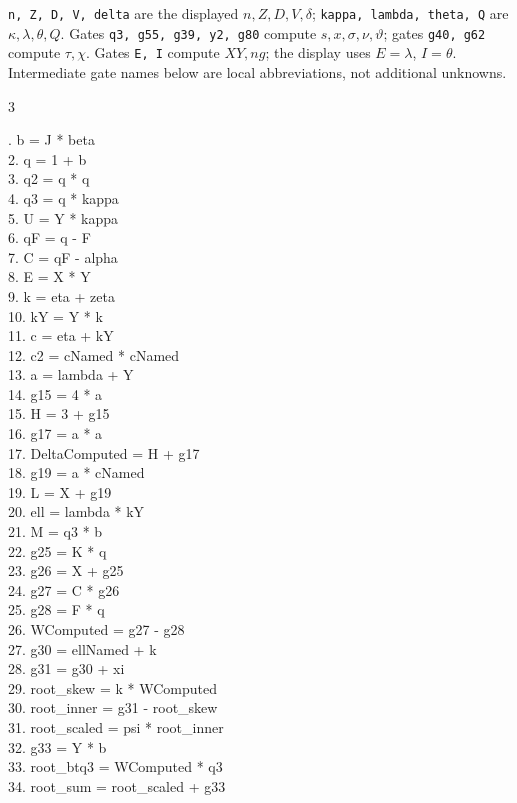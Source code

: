 \documentclass[10pt]{article}
\begin{document}
\texttt{n, Z, D, V, delta} are the displayed
$n,Z,D,V,\delta$; \texttt{kappa, lambda, theta, Q}
are $\kappa,\lambda,\theta,Q$. Gates \texttt{q3, g55, g39, y2, g80} compute $s,x,\sigma,\nu,\vartheta$; gates \texttt{g40, g62} compute $\tau,\chi$. Gates \texttt{E, I} compute
$XY,ng$; the display uses $E=\lambda$, $I=\theta$. Intermediate gate
names below are local abbreviations, not additional unknowns.
\begin{multicols}{3}
\raggedright\ttfamily\fontsize{7.2}{8.4}. b = J * beta\\
2. q = 1 + b\\
3. q2 = q * q\\
4. q3 = q * kappa\\
5. U = Y * kappa\\
6. qF = q - F\\
7. C = qF - alpha\\
8. E = X * Y\\
9. k = eta + zeta\\
10. kY = Y * k\\
11. c = eta + kY\\
12. c2 = cNamed * cNamed\\
13. a = lambda + Y\\
14. g15 = 4 * a\\
15. H = 3 + g15\\
16. g17 = a * a\\
17. DeltaComputed = H + g17\\
18. g19 = a * cNamed\\
19. L = X + g19\\
20. ell = lambda * kY\\
21. M = q3 * b\\
22. g25 = K * q\\
23. g26 = X + g25\\
24. g27 = C * g26\\
25. g28 = F * q\\
26. WComputed = g27 - g28\\
27. g30 = ellNamed + k\\
28. g31 = g30 + xi\\
29. root\_skew = k * WComputed\\
30. root\_inner = g31 - root\_skew\\
31. root\_scaled = psi * root\_inner\\
32. g33 = Y * b\\
33. root\_btq3 = WComputed * q3\\
34. root\_sum = root\_scaled + g33\\

\end{multicols}
\end{document}
